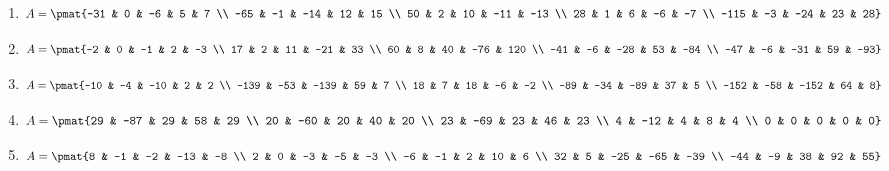 \begin{enumerate}
\item

\begin{align*}
A = \pmat{-31 & 0 & -6 & 5 & 7 \\ -65 & -1 & -14 & 12 & 15 \\ 50 & 2 & 10 & -11 & -13 \\ 28 & 1 & 6 & -6 & -7 \\ -115 & -3 & -24 & 23 & 28}
\end{align*}

\item

\begin{align*}
A = \pmat{-2 & 0 & -1 & 2 & -3 \\ 17 & 2 & 11 & -21 & 33 \\ 60 & 8 & 40 & -76 & 120 \\ -41 & -6 & -28 & 53 & -84 \\ -47 & -6 & -31 & 59 & -93}
\end{align*}

\item

\begin{align*}
A = \pmat{-10 & -4 & -10 & 2 & 2 \\ -139 & -53 & -139 & 59 & 7 \\ 18 & 7 & 18 & -6 & -2 \\ -89 & -34 & -89 & 37 & 5 \\ -152 & -58 & -152 & 64 & 8}
\end{align*}

\item

\begin{align*}
A = \pmat{29 & -87 & 29 & 58 & 29 \\ 20 & -60 & 20 & 40 & 20 \\ 23 & -69 & 23 & 46 & 23 \\ 4 & -12 & 4 & 8 & 4 \\ 0 & 0 & 0 & 0 & 0}
\end{align*}

\item

\begin{align*}
A = \pmat{8 & -1 & -2 & -13 & -8 \\ 2 & 0 & -3 & -5 & -3 \\ -6 & -1 & 2 & 10 & 6 \\ 32 & 5 & -25 & -65 & -39 \\ -44 & -9 & 38 & 92 & 55}
\end{align*}


\end{enumerate}
